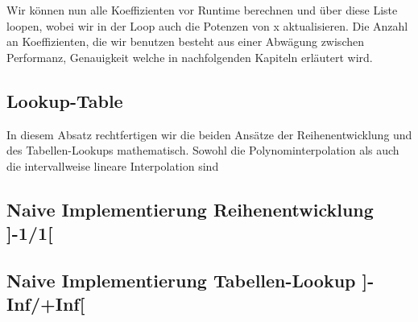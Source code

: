\documentclass[course=erap] {aspdoc}
\begin{document}
    Wir können nun alle Koeffizienten vor Runtime berechnen und über diese Liste loopen, wobei wir in der Loop auch die Potenzen von x aktualisieren. Die
    Anzahl an Koeffizienten, die wir benutzen besteht aus einer Abwägung zwischen Performanz, Genauigkeit welche in nachfolgenden Kapiteln erläutert wird.

    \subsection{Lookup-Table}
    

    In diesem Absatz rechtfertigen wir die beiden Ansätze der Reihenentwicklung und des Tabellen-Lookups mathematisch.
    Sowohl die Polynominterpolation als auch die intervallweise lineare Interpolation sind 









    \subsection{Naive Implementierung Reihenentwicklung ]-1/1[}

    \subsection{Naive Implementierung Tabellen-Lookup ]-Inf/+Inf[}
\end{document}

